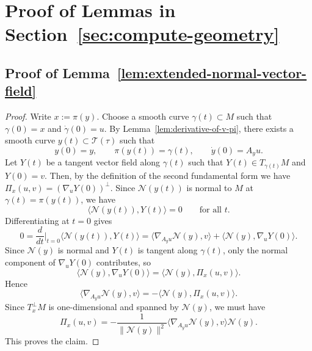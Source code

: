 \documentclass[11pt]{article}
\theoremstyle{plain}
\theoremstyle{definition}
\begin{document}
\section{Proof of Lemmas in Section~\ref{sec:compute-geometry}}\label{app:lemma-sec4}

\subsection{Proof of Lemma~\ref{lem:extended-normal-vector-field}}\label{sec:pf-extended normal vector field}
\begin{proof}
Write $x:=\pi(y)$. 
Choose a smooth curve $\gamma(t)\subset M$ such that $\gamma(0)=x$ and $\dot\gamma(0)=u$. By Lemma~\ref{lem:derivative-of-v-pi}, there exists a smooth curve $y(t)\subset \mathcal T(\tau)$ such that
\[
y(0)=y,\qquad \pi(y(t))=\gamma(t),\qquad \dot y(0)=A_yu.
\]
Let $Y(t)$ be a tangent vector field along $\gamma(t)$ such that $Y(t)\in T_{\gamma(t)}M$ and $Y(0)=v$. Then, by the definition of the second fundamental form we have $\Pi_x(u,v)=(\nabla_u Y(0))^\perp$.
Since $\mathcal N(y(t))$ is normal to $M$ at $\gamma(t)=\pi(y(t))$, we have
\[
\langle \mathcal N(y(t)), Y(t)\rangle =0
\qquad\text{for all }t.
\]
Differentiating at $t=0$ gives
\[
0
=
\frac{d}{dt}\Big|_{t=0}\langle \mathcal N(y(t)),Y(t)\rangle
=
\big\langle \nabla_{A_yu}\mathcal N(y),v\big\rangle
+
\big\langle \mathcal N(y),\nabla_uY(0)\big\rangle.
\]
Since $\mathcal N(y)$ is normal and $Y(t)$ is tangent along $\gamma(t)$, only the normal component of $\nabla_uY(0)$ contributes, so
\[
\big\langle \mathcal N(y),\nabla_uY(0)\big\rangle
=
\big\langle \mathcal N(y),\Pi_x(u,v)\big\rangle.
\]
Hence
\[
\big\langle \nabla_{A_yu}\mathcal N(y),v\big\rangle
=
-
\big\langle \mathcal N(y),\Pi_x(u,v)\big\rangle.
\]
Since $T_x^\perp M$ is one-dimensional and spanned by $\mathcal N(y)$, we must have
\[
\Pi_x(u,v)
=
-\frac{1}{\|\mathcal N(y)\|^2}
\big\langle \nabla_{A_yu}\mathcal N(y),v\big\rangle\mathcal N(y).
\]
This proves the claim.
\end{proof}
\end{document}
